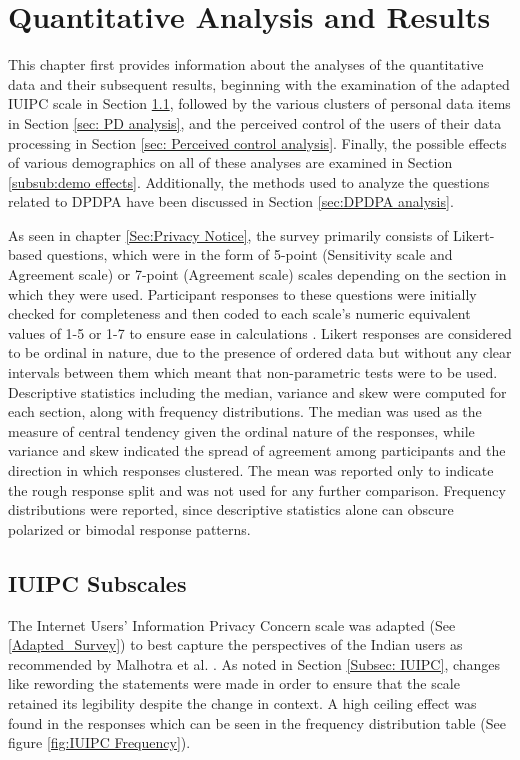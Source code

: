 \chapter{Quantitative Analysis and Results} \label{chapter: Quant Analysis&Results}
This chapter first provides information about the analyses of the quantitative data and their subsequent results, beginning with the examination of the adapted IUIPC scale in Section \ref{sec: IUIPC analysis}, followed by the various clusters of personal data items in Section \ref{sec: PD analysis}, and the perceived control of the users of their data processing in Section \ref{sec: Perceived control analysis}. Finally, the possible effects of various demographics on all of these analyses are examined in Section \ref{subsub:demo effects}. Additionally, the methods used to analyze the questions related to DPDPA have been discussed in Section \ref{sec:DPDPA analysis}.


As seen in chapter \ref{Sec:Privacy Notice}, the survey primarily consists of Likert-based questions, which were in the form of 5-point (Sensitivity scale and Agreement scale) or 7-point (Agreement scale) scales depending on the section in which they were used. Participant responses to these questions were initially checked for completeness and then coded to each scale's numeric equivalent values of 1-5 or 1-7 to ensure ease in calculations . Likert responses are considered to be ordinal in nature, due to the presence of ordered data but without any clear intervals between them which meant that non-parametric tests were to be used. Descriptive statistics including the median, variance and skew were computed for each section, along with frequency distributions. The median was used as the measure of central tendency given the ordinal nature of the responses, while variance and skew indicated the spread of agreement among participants and the direction in which responses clustered. The mean was reported only to indicate the rough response split and was not used for any further comparison. Frequency distributions were reported, since descriptive statistics alone can obscure polarized or bimodal response patterns. 

\section{IUIPC Subscales} \label{sec: IUIPC analysis}
The Internet Users' Information Privacy Concern scale was adapted (See \ref{Adapted_Survey}) to best capture the perspectives of the Indian users as recommended by Malhotra et al. \cite{malhotra_internet_2004}. As noted in Section \ref{Subsec: IUIPC}, changes like rewording the statements were made in order to ensure that the scale retained its legibility despite the change in context. A high ceiling effect was found in the responses which can be seen in the frequency distribution table (See figure \ref{fig:IUIPC Frequency}).

